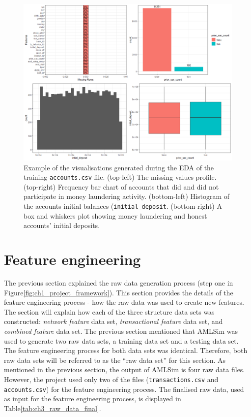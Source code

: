 \begin{figure}
	\begin{center}
		\includegraphics[scale=0.5]{fig/CH3/train_acc_summary.png}
		\caption{Example of the visualisations generated during the EDA of the training \texttt{accounts.csv} file. (top-left) The missing values profile. (top-right) Frequency bar chart of accounts that did and did not participate in money laundering activity. (bottom-left) Histogram of the accounts initial balances (\texttt{initial\_deposit}.  (bottom-right) A box and whiskers plot showing money laundering and honest accounts' initial deposits.}
		\label{fig:ch3_raw_eda_train_acct_sum}
	\end{center}	
\end{figure}

\section{Feature engineering} \label{ch3_sub_heading_feature_engineering}

The previous section explained the raw data generation process (step one in Figure\ref{fig:ch1_project_framework}). This section  provides the details of the feature engineering process - how the raw data was used to create new features. The section will explain how each of the three structure data sets was constructed: \textit{network feature} data set, \textit{transactional feature} data set, and \textit{combined feature} data set. The previous section  mentioned that AMLSim was used to generate two raw data sets, a training data set and a testing data set. The feature engineering process for both data sets was identical. Therefore, both raw data sets will be referred to as the ``raw data set'' for this section.  
As mentioned in the previous section, the output of AMLSim is four raw data files. However, the project used only two of the files (\texttt{transactions.csv} and \texttt{accounts.csv}) for the feature engineering process. The finalised raw data, used as input for the feature engineering process, is displayed in Table\ref{tab:ch3_raw_data_final}. 

